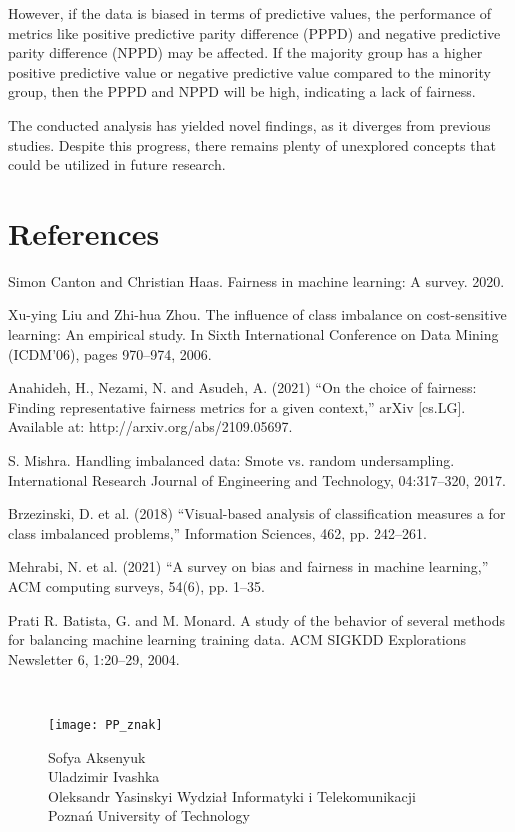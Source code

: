 \documentclass[a4paper, 12pt]{article}
\begin{document}
However, if the data is biased in terms of predictive values, the performance of metrics like positive predictive parity difference (PPPD) and negative predictive parity difference (NPPD) may be affected. If the majority group has a higher positive predictive value or negative predictive value compared to the minority group, then the PPPD and NPPD will be high, indicating a lack of fairness.

The conducted analysis has yielded novel findings, as it diverges from previous studies. Despite this progress, there remains plenty of unexplored concepts that could be utilized in future research.


\clearpage

\section{References}
\normalsize
\begin{thebibliography}{9}

 Simon Canton and Christian Haas. Fairness in machine learning: A survey. 2020.

 Xu-ying Liu and Zhi-hua Zhou. The influence of class imbalance on cost-sensitive learning: An empirical study. In Sixth International Conference on Data Mining (ICDM’06), pages 970–974, 2006.

 Anahideh, H., Nezami, N. and Asudeh, A. (2021) “On the choice of fairness: Finding representative fairness metrics for a given context,” arXiv [cs.LG]. Available at: http://arxiv.org/abs/2109.05697.

 S. Mishra. Handling imbalanced data: Smote vs. random undersampling. International Research Journal of Engineering and Technology, 04:317–320, 2017.

 Brzezinski, D. et al. (2018) “Visual-based analysis of classification measures a for class imbalanced problems,” Information Sciences, 462, pp. 242–261.

 Mehrabi, N. et al. (2021) “A survey on bias and fairness in machine learning,” ACM computing surveys, 54(6), pp. 1–35.

 Prati R. Batista, G. and M. Monard. A study of the behavior of several methods for balancing machine learning training data. ACM SIGKDD Explorations Newsletter 6, 1:20–29, 2004.
\end{thebibliography}

\clearpage
\null
~\vfill~\vfill

\begin{SCfigure}[][h]
\captionsetup{width=3.0\textwidth}
\texttt{[image: PP\_znak]}
\caption*{\scriptsize 
Sofya Aksenyuk\\ 
Uladzimir Ivashka\\
Oleksandr Yasinskyi\bigbreak
Wydział Informatyki i Telekomunikacji\\
Poznań University of Technology}
\end{SCfigure}

\thispagestyle{empty}
\end{document}
